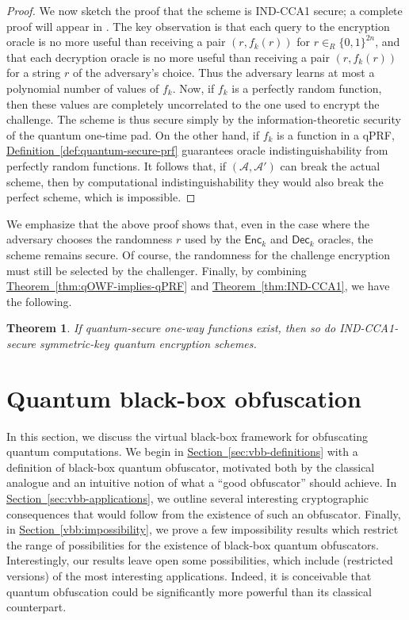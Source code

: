 \documentclass[11pt]{article}
\numberwithin{equation}{section}
\newtheorem{theorem}{Theorem}
\newcommand{\expref}[2]{\texorpdfstring{\hyperref[#2]{#1~\ref{#2}}}{#1~\ref{#2}}}
\newcommand{\algo}{\mathcal}
\newcommand{\Enc}{\ensuremath{\mathsf{Enc}}\xspace}
\newcommand{\Dec}{\ensuremath{\mathsf{Dec}}\xspace}
\newcommand{\inrand}{\in_R}
\begin{document}
{\begin{proof}
We now sketch the proof that the scheme is IND-CCA1 secure; a complete proof will appear in \cite{ABFGSS15}. The key observation is that each query to the encryption oracle is no more useful than receiving a pair $(r, f_k(r))$ for $r \inrand \{0, 1\}^{2n}$, and that each decryption oracle is no more useful than receiving a pair $(r, f_k(r))$ for a string $r$ of the adversary's choice. Thus the adversary learns at most a polynomial number of values of $f_k$. Now, if $f_k$ is a perfectly random function, then these values are completely uncorrelated to the one used to encrypt the challenge. The scheme is thus secure simply by the information-theoretic security of the quantum one-time pad. On the other hand, if $f_k$ is a function in a qPRF, \expref{Definition}{def:quantum-secure-prf} guarantees oracle indistinguishability from perfectly random functions. It follows that, if $(\algo A, \algo A')$ can break the actual scheme, then by computational indistinguishability they would also break the perfect scheme, which is impossible.
\end{proof}

We emphasize that the above proof shows that, even in the case where the adversary chooses the randomness $r$ used by the $\Enc_k$ and $\Dec_k$ oracles, the scheme remains secure. Of course, the randomness for the challenge encryption must still be selected by the challenger. Finally, by combining \expref{Theorem}{thm:qOWF-implies-qPRF} and \expref{Theorem}{thm:IND-CCA1}, we have the following.

\begin{theorem}\label{thm:qOWF-implies-qSKE}
If quantum-secure one-way functions exist, then so do IND-CCA1-secure symmetric-key quantum encryption schemes.
\end{theorem}

\section{Quantum black-box obfuscation}\label{sec:black-box}

In this section, we discuss the virtual black-box framework for obfuscating quantum computations. We begin in \expref{Section}{sec:vbb-definitions} with a definition of black-box quantum obfuscator, motivated both by the classical analogue and an intuitive notion of what a ``good obfuscator'' should achieve. In \expref{Section}{sec:vbb-applications}, we outline several interesting cryptographic consequences that would follow from the existence of such an obfuscator. Finally, in \expref{Section}{vbb:impossibility}, we prove a few impossibility results which restrict the range of possibilities for the existence of black-box quantum obfuscators. Interestingly, our results leave open some possibilities, which include (restricted versions) of the most interesting applications. Indeed, it is conceivable that quantum obfuscation could be significantly more powerful than its classical counterpart.

}
\end{document}

